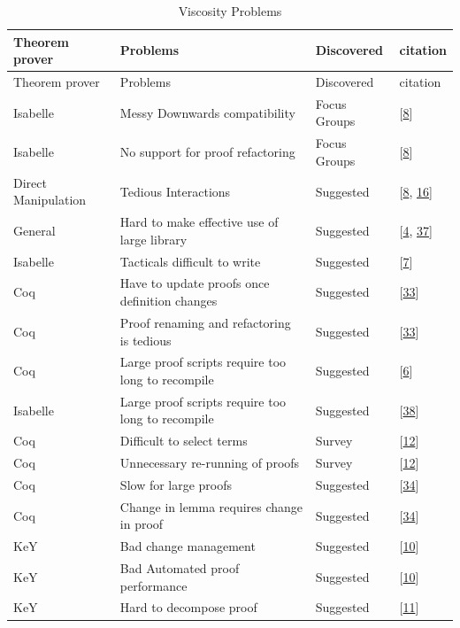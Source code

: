 \documentclass[
]{article}
\begin{document}
\begin{longtable}[]{@{}llll@{}}
\caption{\label{tbl:viscosity}Viscosity Problems}\tabularnewline
\toprule
Theorem prover & Problems & Discovered & citation \\
\midrule
\endfirsthead
\toprule
Theorem prover & Problems & Discovered & citation \\
\midrule
\endhead
Isabelle & Messy Downwards compatibility & Focus Groups &
{[}\protect\hyperlink{ref-beckert_usability_2015}{8}{]} \\
Isabelle & No support for proof refactoring & Focus Groups &
{[}\protect\hyperlink{ref-beckert_usability_2015}{8}{]} \\
Direct Manipulation & Tedious Interactions & Suggested &
{[}\protect\hyperlink{ref-beckert_usability_2015}{8},
\protect\hyperlink{ref-grebing_usability_2020}{16}{]} \\
General & Hard to make effective use of large library & Suggested &
{[}\protect\hyperlink{ref-asperti_considerations_2010}{4},
\protect\hyperlink{ref-tassi_interactive_2008}{37}{]} \\
Isabelle & Tacticals difficult to write & Suggested &
{[}\protect\hyperlink{ref-becker_lassie_2021}{7}{]} \\
Coq & Have to update proofs once definition changes & Suggested &
{[}\protect\hyperlink{ref-ringer_replica_2020}{33}{]} \\
Coq & Proof renaming and refactoring is tedious & Suggested &
{[}\protect\hyperlink{ref-ringer_replica_2020}{33}{]} \\
Coq & Large proof scripts require too long to recompile & Suggested &
{[}\protect\hyperlink{ref-barras_asynchronous_2015}{6}{]} \\
Isabelle & Large proof scripts require too long to recompile & Suggested
& {[}\protect\hyperlink{ref-wenzel_asynchronous_2014}{38}{]} \\
Coq & Difficult to select terms & Survey &
{[}\protect\hyperlink{ref-berman_development_2014}{12}{]} \\
Coq & Unnecessary re-running of proofs & Survey &
{[}\protect\hyperlink{ref-berman_development_2014}{12}{]} \\
Coq & Slow for large proofs & Suggested &
{[}\protect\hyperlink{ref-roe_coqpie_2016}{34}{]} \\
Coq & Change in lemma requires change in proof & Suggested &
{[}\protect\hyperlink{ref-roe_coqpie_2016}{34}{]} \\
KeY & Bad change management & Suggested &
{[}\protect\hyperlink{ref-beckert_evaluating_2012}{10}{]} \\
KeY & Bad Automated proof performance & Suggested &
{[}\protect\hyperlink{ref-beckert_evaluating_2012}{10}{]} \\
KeY & Hard to decompose proof & Suggested &
{[}\protect\hyperlink{ref-beckert_interactive_2015}{11}{]} \\
\bottomrule
\end{longtable}
\end{document}
